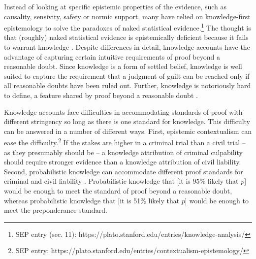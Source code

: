 \documentclass{article}
\begin{document}
%
Instead of looking at specific epistemic properties of the evidence, such as causality, sensivity, safety or normic support, many have relied on knowledge-first epistemology to solve the paradoxes of naked statistical evidence.\footnote{SEP entry (sec. 11): https://plato.stanford.edu/entries/knowledge-analysis/} The thought is that (roughly) naked statistical evidence is epistemically deficient because it fails to warrant knowledge  \citep{DuffEtAl20017, BlomeTillmann2017, littlejohn2017, moss2018}. 
Despite differences in detail, knowledge accounts have the advantage of capturing certain intuitive requirements of proof beyond a reasonable doubt. Since knowledge is a form of settled belief, knowledge is well suited to capture the requirement that a judgment of guilt can be reached only if all reasonable doubts have been ruled out. Further, knowledge is notoriously hard to define, a feature shared by proof beyond a reasonable doubt \citep{moss2020}.  

Knowledge accounts 
face difficulties in accommodating standards of proof with different stringency so long as there is one standard for knowledge. This difficulty can be answered in a number of different ways. First, epistemic contextualism can ease the difficulty.\footnote{SEP entry: https://plato.stanford.edu/entries/contextualism-epistemology/} If the stakes are higher in a criminal trial than a civil trial -- as they presumably should be -- a knowledge attribution of criminal culpability should require stronger evidence than a knowledge attribution of civil liability. 
Second, probabilistic knowledge  can  accommodate different proof standards for criminal and civil liability \citep{moss2018}.
 Probabilistic knowledge that [it is 95\% likely that $p$] would be enough to meet the standard of proof beyond a reasonable doubt, whereas probabilistic knowledge that [it is 51\% likely that $p$]  would be enough to meet the preponderance standard.
 
\end{document}
